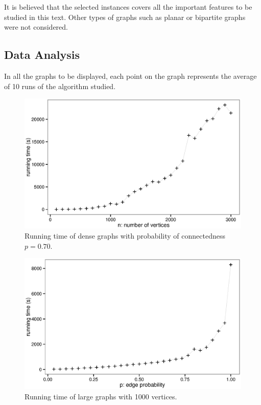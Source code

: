 \documentclass{article}
\begin{document}
It is believed that the selected instances covers all the important features to be studied in this text. Other types of graphs such as  planar or  bipartite graphs were not considered. 

\subsection{Data Analysis}

In all the graphs to be displayed, each point on the graph represents the average of 10 runs of the algorithm studied. 



\begin{figure}[!htb]
\label{fig:dense}
{\centering \includegraphics[width=1\textwidth]{dense} 
\caption{Running time of dense graphs with probability of connectedness $p=0.70$.}
}
\end{figure}




\begin{figure}[!htb]
\label{fig:large}
{\centering \includegraphics[width=1\textwidth]{large} 
\caption{Running time of large graphs with 1000 vertices.}
}
\end{figure}
\end{document}
